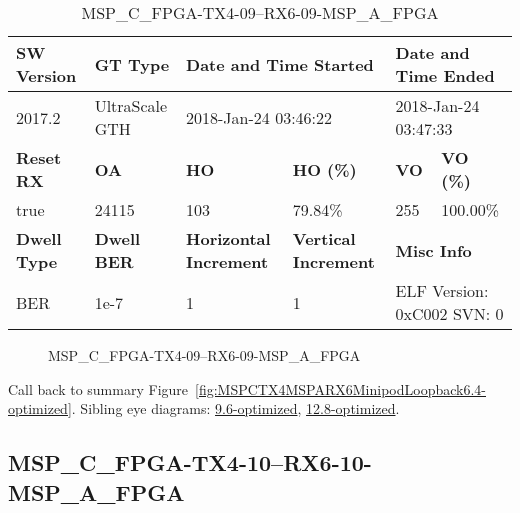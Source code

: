 \begin{table}[h]
\centering
\caption{MSP\_C\_FPGA-TX4-09--RX6-09-MSP\_A\_FPGA}
\label{tab:MSPCFPGATX409RX609MSPAFPGA6.4-optimized}
\begin{tabular}{@{}|l|l|l|l|l|l|@{}}
\toprule
\textbf{SW Version}                & \textbf{GT Type}   & \multicolumn{2}{l|}{\textbf{Date and Time Started}}            & \multicolumn{2}{l|}{\textbf{Date and Time Ended}}        \\ \midrule
2017.2                       & UltraScale GTH          & \multicolumn{2}{l|}{2018-Jan-24 03:46:22}                   & \multicolumn{2}{l|}{2018-Jan-24 03:47:33}               \\ \midrule
\textbf{Reset RX}                  & \textbf{OA} & \textbf{HO}   & \textbf{HO (\%)} & \textbf{VO} & \textbf{VO (\%)} \\ \midrule
true & 24115        & 103          & 79.84\%        & 255        & 100.00\%       \\ \midrule
\textbf{Dwell Type}                & \textbf{Dwell BER} & \textbf{Horizontal Increment} & \textbf{Vertical Increment}    & \multicolumn{2}{l|}{\textbf{Misc Info}}                  \\ \midrule
BER                            & 1e-7        & 1        & 1           & \multicolumn{2}{l|}{ELF Version: 0xC002 SVN: 0}                         \\ \bottomrule
\end{tabular}
\end{table}

\begin{figure}[h]
\caption{MSP\_C\_FPGA-TX4-09--RX6-09-MSP\_A\_FPGA} \label{fig:MSPCFPGATX409RX609MSPAFPGA6.4-optimized}
\end{figure}

Call back to summary Figure~\ref{fig:MSPCTX4MSPARX6MinipodLoopback6.4-optimized}.
Sibling eye diagrams: \hyperref[sec:MSPCFPGATX409RX609MSPAFPGA9.6-optimized]{9.6-optimized}, \hyperref[sec:MSPCFPGATX409RX609MSPAFPGA12.8-optimized]{12.8-optimized}.

\clearpage
\newpage


\subsection{MSP\_C\_FPGA-TX4-10--RX6-10-MSP\_A\_FPGA}\label{sec:MSPCFPGATX410RX610MSPAFPGA6.4-optimized}

